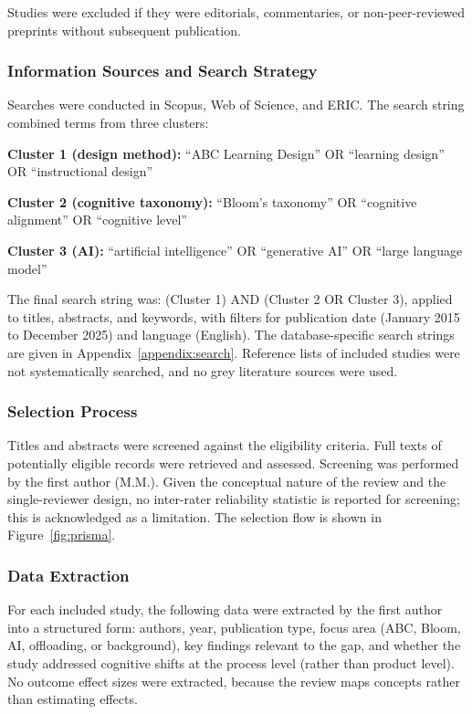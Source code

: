 \documentclass[journal,article,submit,pdftex,moreauthors]{Definitions/mdpi}
\begin{document}
Studies were excluded if they were editorials, commentaries, or non-peer-reviewed preprints without subsequent publication.

\subsubsection{Information Sources and Search Strategy}
\label{sec:search}

Searches were conducted in Scopus, Web of Science, and ERIC. The search string combined terms from three clusters:

\textbf{Cluster 1 (design method):} ``ABC Learning Design'' OR ``learning design'' OR ``instructional design''

\textbf{Cluster 2 (cognitive taxonomy):} ``Bloom's taxonomy'' OR ``cognitive alignment'' OR ``cognitive level''

\textbf{Cluster 3 (AI):} ``artificial intelligence'' OR ``generative AI'' OR ``large language model''

The final search string was: (Cluster 1) AND (Cluster 2 OR Cluster 3), applied to titles, abstracts, and keywords, with filters for publication date (January 2015 to December 2025) and language (English). The database-specific search strings are given in Appendix~\ref{appendix:search}. Reference lists of included studies were not systematically searched, and no grey literature sources were used.

\subsubsection{Selection Process}
\label{sec:selection}

Titles and abstracts were screened against the eligibility criteria. Full texts of potentially eligible records were retrieved and assessed. Screening was performed by the first author (M.M.). Given the conceptual nature of the review and the single-reviewer design, no inter-rater reliability statistic is reported for screening; this is acknowledged as a limitation. The selection flow is shown in Figure~\ref{fig:prisma}.

\subsubsection{Data Extraction}
\label{sec:extraction}

For each included study, the following data were extracted by the first author into a structured form: authors, year, publication type, focus area (ABC, Bloom, AI, offloading, or background), key findings relevant to the gap, and whether the study addressed cognitive shifts at the process level (rather than product level). No outcome effect sizes were extracted, because the review maps concepts rather than estimating effects.
\end{document}
